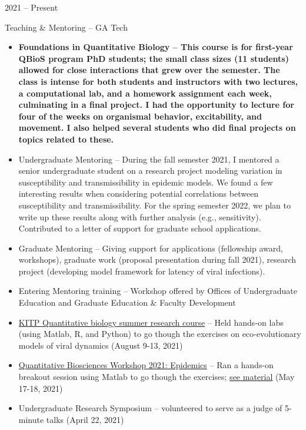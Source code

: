 \documentclass[a4paper,10pt]{article}
\newlength{\cvcolumngapwidth}
\newlength{\cvleftcolumnwidth}
\newlength{\cvrightcolumnwidth}
\newcommand{\cvtitlestyle}[1]{{\large\cvtitlefont\textcolor{cvtitlecolor}{#1}}}
\newcommand{\cvheadingstyle}[1]{{\normalsize\cvheadingfont\textcolor{cvheadingcolor}{#1}}}
\newlength{\cvafteritemskipamount}
\newlength{\cvaftertitleskipamount}
\newlength{\cvparskip}
\newcommand{\cvitem}[2]{
            \begin{minipage}[t]{\cvleftcolumnwidth}
                \raggedleft #1
            \end{minipage}%
            \hspace{\cvcolumngapwidth}%
            \begin{minipage}[t]{\cvrightcolumnwidth}
                \setlength{\parskip}{\cvparskip} #2
            \end{minipage}
        
            \vspace{\cvafteritemskipamount}
        }
\newcommand{\cvtitle}[1]{
            \cvtitlestyle{#1}
        
            \vspace{\cvaftertitleskipamount}
            \vspace{-\cvparskip}
        }
\begin{document}
	\cvitem{
            \cvheadingstyle{2021 -- Present}
        }{
            \cvtitle{Teaching \& Mentoring -- GA Tech}
            \begin{itemize}[leftmargin=*]
                \item \bf{Foundations in Quantitative Biology} -- This course is for first-year QBioS program PhD students; the small class sizes (11 students) allowed for close interactions that grew over the semester. The class is intense for both students and instructors with two lectures, a computational lab, and a homework assignment each week, culminating in a final project. I had the opportunity to lecture for four of the weeks on organismal behavior, excitability, and movement. I also helped several students who did final projects on topics related to these.
                \item Undergraduate Mentoring -- During the fall semester 2021, I mentored a senior undergraduate student on a research project modeling variation in susceptibility and transmissibility in epidemic models. We found a few interesting results when considering potential correlations between susceptibility and transmissibility. For the spring semester 2022, we plan to write up these results along with further analysis (e.g., sensitivity). Contributed to a letter of support for graduate school applications.
                \item Graduate Mentoring -- Giving support for applications (fellowship award, workshops), graduate work (proposal presentation during fall 2021), research project (developing model framework for latency of viral infections). 
                \item Entering Mentoring training -- Workshop offered by Offices of Undergraduate Education and Graduate Education \& Faculty Development
                   \item \href{https://www.kitp.ucsb.edu/qbio}{KITP Quantitative biology summer research course} -- Held hands-on labs (using Matlab, R, and Python) to go though the exercises on eco-evolutionary models of viral dynamics  (August 9-13, 2021)
    	\item \href{https://workshop2021.qbios.gatech.edu/schedule/}{Quantitative Biosciences Workshop 2021: Epidemics} -- Ran a hands-on breakout session using Matlab to go though the exercises; \href{https://github.com/Jeremy-D-Harris/qBiosWorkshop2021_TeamOutbreak}{see material} (May 17-18, 2021)
    	\item Undergraduate Research Symposium -- volunteered to serve as a judge of 5-minute talks (April 22, 2021)

            \end{itemize}
        }
                
\end{document}
